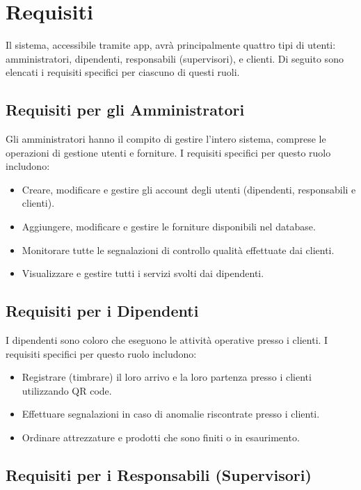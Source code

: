 \documentclass[twoside]{supsistudent}
\begin{document}
\section{Requisiti}

Il sistema, accessibile tramite app, avrà principalmente quattro tipi di utenti: amministratori, dipendenti, responsabili (supervisori), e clienti. Di seguito sono elencati i requisiti specifici per ciascuno di questi ruoli.

\subsection{Requisiti per gli Amministratori}

Gli amministratori hanno il compito di gestire l'intero sistema, comprese le operazioni di gestione utenti e forniture. I requisiti specifici per questo ruolo includono:

\begin{itemize}
  \item Creare, modificare e gestire gli account degli utenti (dipendenti, responsabili e clienti).
  \item Aggiungere, modificare e gestire le forniture disponibili nel database.
  \item Monitorare tutte le segnalazioni di controllo qualità effettuate dai clienti.
  \item Visualizzare e gestire tutti i servizi svolti dai dipendenti.
\end{itemize}

\subsection{Requisiti per i Dipendenti}

I dipendenti sono coloro che eseguono le attività operative presso i clienti. I requisiti specifici per questo ruolo includono:

\begin{itemize}
  \item Registrare (timbrare) il loro arrivo e la loro partenza presso i clienti utilizzando QR code.
  \item Effettuare segnalazioni in caso di anomalie riscontrate presso i clienti.
  \item Ordinare attrezzature e prodotti che sono finiti o in esaurimento.
\end{itemize}

\subsection{Requisiti per i Responsabili (Supervisori)}
\end{document}
